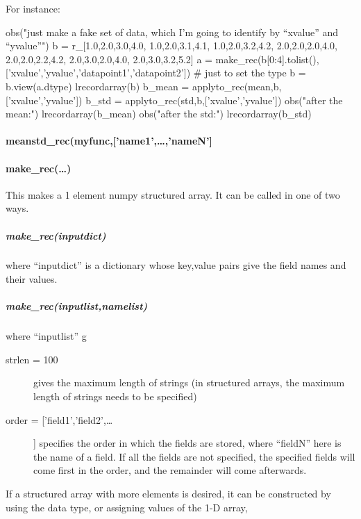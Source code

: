 For instance:

\begin{python}
obs("just make a fake set of data, which I'm going to identify by ``xvalue'' and ``yvalue''")
b = r_[1.0,2.0,3.0,4.0,
    1.0,2.0,3.1,4.1,
    1.0,2.0,3.2,4.2,
    2.0,2.0,2.0,4.0,
    2.0,2.0,2.2,4.2,
    2.0,3.0,2.0,4.0,
    2.0,3.0,3.2,5.2]
a = make_rec(b[0:4].tolist(),['xvalue','yvalue','datapoint1','datapoint2']) # just to set the type
b = b.view(a.dtype)
lrecordarray(b)
b_mean = applyto_rec(mean,b,['xvalue','yvalue'])
b_std = applyto_rec(std,b,['xvalue','yvalue'])
obs("after the mean:")
lrecordarray(b_mean)
obs("after the std:")
lrecordarray(b_std)
\end{python}

\paragraph{meanstd\_rec(myfunc,['name1',\ldots,'nameN']}
\paragraph{make\_rec(\ldots)}
This makes a 1 element numpy structured array.
It can be called in one of two ways.

\subparagraph{make\_rec(inputdict)} where ``inputdict'' is a dictionary
    whose key,value pairs give the field names and their values.

\subparagraph{make\_rec(inputlist,namelist)}
    where ``inputlist'' g
\begin{mykwargs}
    \begin{description}
        \item[strlen = 100] gives the maximum length of strings
            (in structured arrays, the maximum length of strings needs to be
            specified)
        \item[order = ['field1','field2',\ldots] ]
            specifies the order in which the fields are stored,
            where ``fieldN'' here is the name of a field.
            If all the fields are not specified, the specified fields
            will come first in the order, and the remainder will come afterwards.
    \end{description}
\end{mykwargs}
If a structured array with more elements is desired,
    it can be constructed by using the data type, or assigning values of the 1-D array,
